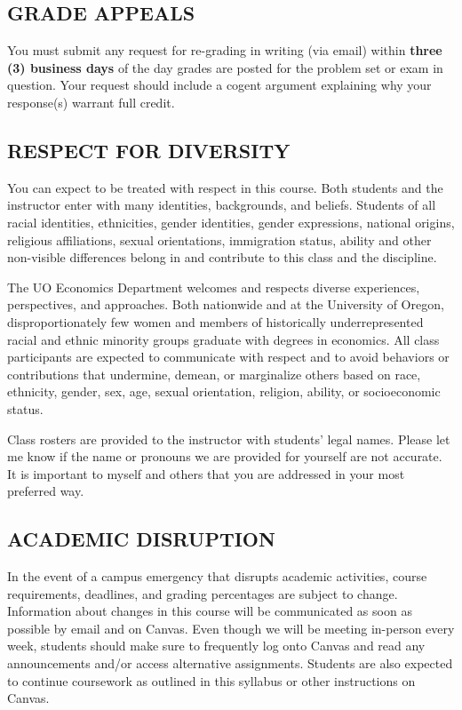 \documentclass[11pt]{article}
\begin{document}
\subsection*{GRADE APPEALS}
You must submit any request for re-grading in writing (via email) within \textbf{three (3) business days} of the day grades are posted for the problem set or exam in question. 
Your request should include a cogent argument explaining why your response(s) warrant full credit. 

\subsection*{RESPECT FOR DIVERSITY}
You can expect to be treated with respect in this course.
Both students and the instructor enter with many identities, backgrounds, and beliefs.
Students of all racial identities, ethnicities, gender identities, gender expressions, national origins, religious affiliations, sexual orientations, immigration status, ability and other non-visible differences belong in and contribute to this class and the discipline.

The UO Economics Department welcomes and respects diverse experiences, perspectives, and approaches. 
Both nationwide and at the University of Oregon, disproportionately few women and members of historically underrepresented racial and ethnic minority groups graduate with degrees in economics. 
All class participants are expected to communicate with respect and to avoid behaviors or contributions that undermine, demean, or marginalize others based on race, ethnicity, gender, sex, age, sexual orientation, religion, ability, or socioeconomic status.

Class rosters are provided to the instructor with students' legal names.
Please let me know if the name or pronouns we are provided for yourself are not accurate.
It is important to myself and others that you are addressed in your most preferred way.

\subsection*{ACADEMIC DISRUPTION}
In the event of a campus emergency that disrupts academic activities, course requirements, deadlines, and grading percentages are subject to change. 
Information about changes in this course will be communicated as soon as possible by email and on Canvas. 
Even though we will be meeting in-person every week, students should make sure to frequently log onto Canvas and read any announcements and/or access alternative assignments. 
Students are also expected to continue coursework as outlined in this syllabus or other instructions on Canvas. 

\vspace{1.5in}


\end{document}

